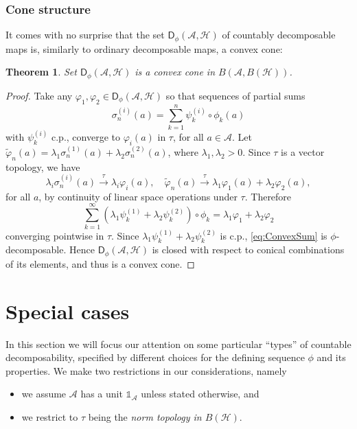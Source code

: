 \documentclass[reqno]{amsart}
\newtheorem{theorem}{Theorem}
\theoremstyle{plain}
\numberwithin{equation}{section}
\numberwithin{theorem}{section}
\numberwithin{lemma}{section}
\numberwithin{definition}{section}
\numberwithin{corollary}{section}
\numberwithin{remark}{section}
\newcommand{\hilbert}{\mathcal{H}}
\newcommand{\unit}{\mathds{1}}
\newcommand{\gdec}[3]{\mathsf{D}_{#1}(#2,#3)}
\begin{document}
\subsubsection{Cone structure}

It comes with no surprise that the set $\gdec{\phi}{\mathscr{A}}{\hilbert}$ of countably decomposable maps is, similarly to ordinary decomposable maps, a convex cone:

\begin{theorem}\label{thm:DphiConvCone}
    Set $\gdec{\phi}{\mathscr{A}}{\hilbert}$ is a convex cone in $B(\mathscr{A},B(\hilbert))$.
\end{theorem}

\begin{proof}
    Take any $\varphi_1, \varphi_2 \in \gdec{\phi}{\mathscr{A}}{\hilbert}$ so that sequences of partial sums
    \begin{equation}
        \sigma_{n}^{(i)}(a) = \sum_{k=1}^{n}\psi^{(i)}_{k}\circ\phi_k (a)
    \end{equation}
    with $\psi^{(i)}_k$ c.p., converge to $\varphi_i (a)$ in $\tau$, for all $a\in\mathscr{A}$. Let $\tilde{\varphi}_n (a) = \lambda_1 \sigma_{n}^{(1)}(a) + \lambda_2 \sigma_{n}^{(2)}(a)$, where $\lambda_1 , \lambda_2 > 0$. Since $\tau$ is a vector topology, we have
    \begin{equation}
        \lambda_i \sigma_{n}^{(i)}(a) \xrightarrow{\tau} \lambda_i \varphi_i (a), \quad \tilde{\varphi}_n (a) \xrightarrow{\tau} \lambda_1 \varphi_1 (a) + \lambda_2 \varphi_2 (a) ,
    \end{equation}
    for all $a$, by continuity of linear space operations under $\tau$. Therefore
    \begin{equation}\label{eq:ConvexSum}
        \sum_{k=1}^{\infty} \left( \lambda_1\psi^{(1)}_k+\lambda_2\psi^{(2)}_k \right)\circ\phi_k = \lambda_1 \varphi_1 + \lambda_2 \varphi_{2}
    \end{equation}
    converging pointwise in $\tau$. Since $\lambda_1\psi^{(1)}_k+\lambda_2\psi^{(2)}_k$ is c.p., \eqref{eq:ConvexSum} is $\phi$-decomposable. Hence $\gdec{\phi}{\mathscr{A}}{\hilbert}$ is closed with respect to conical combinations of its elements, and thus is a convex cone.
\end{proof}

\section{Special cases}

In this section we will focus our attention on some particular ``types'' of countable decomposability, specified by different choices for the defining sequence $\phi$ and its properties. We make two restrictions in our considerations, namely
\begin{itemize}
    \item we assume $\mathscr{A}$ has a unit $\unit_\mathscr{A}$ unless stated otherwise, and
    \item we restrict to $\tau$ being the \emph{norm topology in $B(\hilbert)$}.
\end{itemize}
\end{document}
